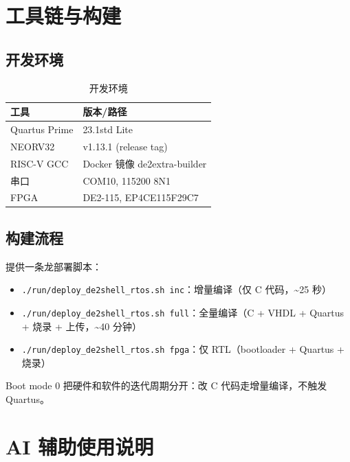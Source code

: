 \documentclass{SYSUReport}
\begin{document}
\section{工具链与构建}

\subsection{开发环境}

\begin{table}[!htbp]
    \centering
    \begin{tabular}{l|l}
        \hline
        \textbf{工具} & \textbf{版本/路径} \\
        \hline
        Quartus Prime & 23.1std Lite \\
        NEORV32 & v1.13.1 (release tag) \\
        RISC-V GCC & Docker 镜像 de2extra-builder \\
        串口 & COM10, 115200 8N1 \\
        FPGA & DE2-115, EP4CE115F29C7 \\
        \hline
    \end{tabular}
    \caption{开发环境}
\end{table}

\subsection{构建流程}

提供一条龙部署脚本：

\begin{itemize}
    \item \texttt{./run/deploy\_de2shell\_rtos.sh inc}：增量编译（仅 C 代码，\textasciitilde{}25 秒）
    \item \texttt{./run/deploy\_de2shell\_rtos.sh full}：全量编译（C + VHDL + Quartus + 烧录 + 上传，\textasciitilde{}40 分钟）
    \item \texttt{./run/deploy\_de2shell\_rtos.sh fpga}：仅 RTL（bootloader + Quartus + 烧录）
\end{itemize}

Boot mode 0 把硬件和软件的迭代周期分开：改 C 代码走增量编译，不触发 Quartus。

\section{AI 辅助使用说明}
\end{document}
